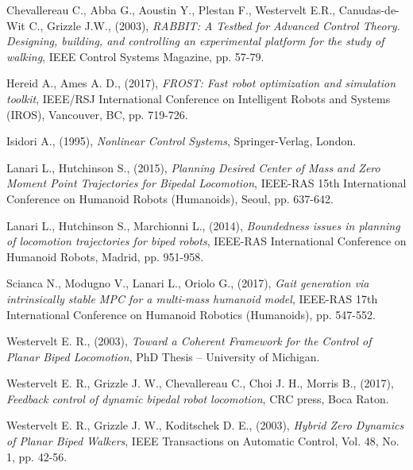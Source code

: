 \documentclass[11pt]{article}
\begin{document}
\begin{thebibliography}{20}

Chevallereau C., Abba G., Aoustin Y., Plestan F., Westervelt E.R.,
Canudas-de-Wit C., Grizzle J.W., (2003), \textit{RABBIT: A Testbed for Advanced Control Theory. Designing, building, and controlling an experimental platform for the study of walking}, IEEE Control Systems Magazine, pp. 57-79.

Hereid A., Ames A. D., (2017), \textit{FROST: Fast robot optimization and simulation toolkit}, IEEE/RSJ International Conference on Intelligent Robots and Systems (IROS), Vancouver, BC, pp. 719-726.

Isidori A., (1995), \textit{Nonlinear Control Systems}, Springer-Verlag, London. 

Lanari L., Hutchinson S., (2015), \textit{Planning Desired Center of Mass and Zero Moment Point Trajectories for Bipedal Locomotion}, IEEE-RAS 15th International Conference on Humanoid Robots (Humanoids), Seoul, pp. 637-642.

Lanari L., Hutchinson S., Marchionni L., (2014), \textit{Boundedness issues in planning of locomotion trajectories for biped robots}, IEEE-RAS International Conference on Humanoid Robots, Madrid, pp. 951-958.

Scianca N., Modugno V., Lanari L., Oriolo G., (2017), \textit{Gait generation via intrinsically stable MPC for a multi-mass humanoid model}, IEEE-RAS 17th International Conference on Humanoid Robotics (Humanoids), pp. 547-552.

Westervelt E. R., (2003), \textit{Toward a Coherent Framework for the Control of Planar Biped Locomotion}, PhD Thesis -- University of Michigan.

Westervelt E. R., Grizzle J. W., Chevallereau C., Choi J. H., Morris B., (2017), \textit{Feedback control of dynamic bipedal robot locomotion}, CRC press, Boca Raton.

Westervelt E. R., Grizzle J. W., Koditschek D. E., (2003), \textit{Hybrid Zero Dynamics of Planar Biped Walkers}, IEEE Transactions on Automatic Control, Vol. 48, No. 1, pp. 42-56.

\end{thebibliography}
\end{document}
